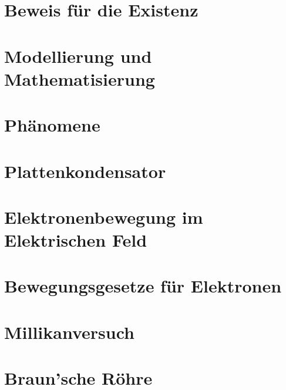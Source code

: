 \section{Beweis für die Existenz}




\section{Modellierung und Mathematisierung}




\section{Phänomene}




\section{Plattenkondensator} \label{sec:plattenkondensator}




\section{Elektronenbewegung im Elektrischen Feld}




\section{Bewegungsgesetze für Elektronen} \label{sec:BewegungsgesetzElektronen}




\section{Millikanversuch} \label{sec:Millikan}




\section{Braun'sche Röhre}  \label{sec:BraunscheRoehre}

